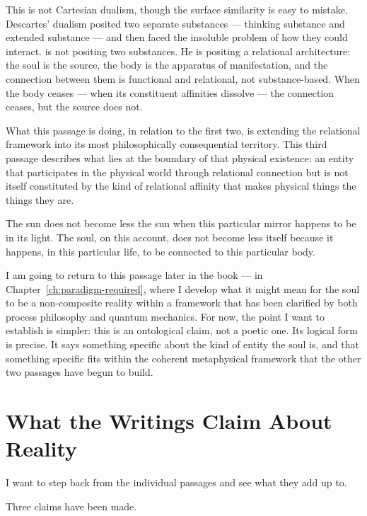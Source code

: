 This is not Cartesian dualism, though the surface similarity is easy to
mistake.
Descartes' dualism posited two separate substances --- thinking substance
and extended substance --- and then faced the insoluble problem of how they
could interact.
\AbdulBaha is not positing two substances.
He is positing a relational architecture: the soul is the source,
the body is the apparatus of manifestation, and the connection between
them is functional and relational, not substance-based.
When the body ceases --- when its constituent affinities dissolve ---
the connection ceases, but the source does not.

What this passage is doing, in relation to the first two, is extending
the relational framework into its most philosophically consequential
territory.
This third passage describes what lies at the boundary of that physical
existence: an entity that participates in the physical world through
relational connection but is not itself constituted by the kind of
relational affinity that makes physical things the things they are.

The sun does not become less the sun when this particular mirror
happens to be in its light.
The soul, on this account, does not become less itself because it happens,
in this particular life, to be connected to this particular body.

I am going to return to this passage later in the book --- in
Chapter~\ref{ch:paradigm-required}, where I develop what it might mean for
the soul to be a non-composite reality within a framework that has been
clarified by both process philosophy and quantum mechanics.
For now, the point I want to establish is simpler: this is an ontological
claim, not a poetic one.
Its logical form is precise.
It says something specific about the kind of entity the soul is, and
that something specific fits within the coherent metaphysical framework
that the other two passages have begun to build.

\section{What the Writings Claim About Reality}
\label{sec:ch3-claims}

I want to step back from the individual passages and see what they
add up to.

Three claims have been made.


